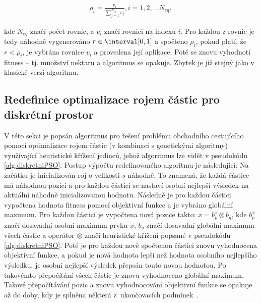 \begin{align}
    \label{eq:ABC_TSP9}
    \rho_i = \frac{v_i}{\sum_{j=1}^{N_{eq}}v_j}, i = 1,2,...N_{eq},
\end{align}

kde $N_{eq}$ značí počet rovnic, a $v_i$ značí rovnici na indexu $i$. Pro každou z rovnic je tedy náhodně vygenerováno $r \in \interval[{0,1}]$ a spočteno $\rho_i$, pokud platí, že $r < \rho_i$, je vybrána rovnice $v_i$ a provedena její aplikace. Poté se znovu vyhodnotí fitness -- tj. množství nektaru a algoritmus se opakuje. Zbytek je již stejný jako v klasické verzi algoritmu.

\subsection{Redefinice optimalizace rojem částic pro diskrétní prostor}
V této sekci je popsán algoritmus pro řešení problému obchodního cestujícího pomocí optimalizace rojem částic (v kombinaci s genetickými algoritmy) využívající heuristické křížení jedinců, jehož algoritmus lze vidět v pseudokódu \ref{alg:diskretniPSO}. Postup výpočtu redefinovaného algoritmu je následující: Na začátku je inicializován roj o velikosti $s$ náhodně. To znamená, že každá částice má náhodnou pozici a pro každou částici se nastaví osobní nejlepší výsledek na aktuální náhodně inicializovanou hodnotu. Následně je pro každou částici vypočtena hodnota fitness pomocí objektivní funkce a je vybráno globální maximum. Pro každou částici je vypočtena nová pozice takto: $x = b^x_p \otimes b_g$, kde $b^x_p$ značí dosavadní osobní maximum prvku $x$, $b_g$ značí dosavadní globální maximum všech částic a operátor $\otimes$ značí heuristické křížení popsané v pseudokódu \ref{alg:diskretniPSO}. Poté je pro každou nově spočtenou částici znovu vyhodnocena objektivní funkce, a pokud je nová hodnota lepší než hodnota osobního nejlepšího výsledku, je osobní nejlepší výsledek přepsán touto novou hodnotou. Po takovémto přepočítání všech částic je znovu vyhodnoceno globální maximum. Takové přepočítávání pozic a znovu vyhodnocování objektivní funkce se opakuje až do doby, kdy je splněna některá z~ukončovacích podmínek~\cite{PSO_GA_TSP}.

